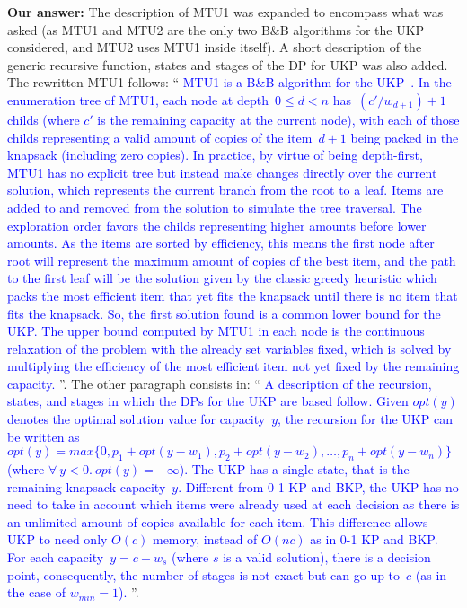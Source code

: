 \documentclass{elsarticle}
\begin{document}
\textbf{Our answer:} The description of MTU1 was expanded to encompass what was asked (as MTU1 and MTU2 are the only two B\&B algorithms for the UKP considered, and MTU2 uses MTU1 inside itself). A short description of the generic recursive function, states and stages of the DP for UKP was also added. The rewritten MTU1 follows: ``\textcolor{blue}{
MTU1 is a B\&B algorithm for the UKP~\citep{mtu1}. %
In the enumeration tree of MTU1, each node at depth~\(0 \leq d < n\) has~\((c'/w_{d+1}) + 1\) childs (where \(c'\) is the remaining capacity at the current node), with each of those childs representing a valid amount of copies of the item~\(d+1\) being packed in the knapsack (including zero copies).
In practice, by virtue of being depth-first, MTU1 has no explicit tree but instead make changes directly over the current solution, which represents the current branch from the root to a leaf.
Items are added to and removed from the solution to simulate the tree traversal.
The exploration order favors the childs representing higher amounts before lower amounts.
As the items are sorted by efficiency, this means the first node after root will represent the maximum amount of copies of the best item, and the path to the first leaf will be the solution given by the classic greedy heuristic which packs the most efficient item that yet fits the knapsack until there is no item that fits the knapsack. So, the first solution found is a common lower bound for the UKP.
The upper bound computed by MTU1 in each node is the continuous relaxation of the problem with the already set variables fixed, which is solved by multiplying the efficiency of the most efficient item not yet fixed by the remaining capacity.
}''.
The other paragraph consists in: ``\textcolor{blue}{
A description of the recursion, states, and stages in which the DPs for the UKP are based follow.
Given \(opt(y)\) denotes the optimal solution value for capacity~\(y\), the recursion for the UKP can be written as \(opt(y) = max \{0, p_1 + opt(y - w_1), p_2 + opt(y - w_2), \dots, p_n + opt(y - w_n)\}\) (where \(\forall~y < 0.~opt(y) = -\infty\)).
The UKP has a single state, that is the remaining knapsack capacity~\(y\).
Different from 0-1 KP and BKP, the UKP has no need to take in account which items were already used at each decision as there is an unlimited amount of copies available for each item.
This difference allows UKP to need only \(O(c)\) memory, instead of \(O(nc)\) as in 0-1 KP and BKP.
For each capacity~\(y = c - w_s\) (where \(s\) is a valid solution), there is a decision point, consequently, the number of stages is not exact but can go up to~\(c\) (as in the case of \(w_{min} = 1\)).
}''.
\medskip
\end{document}
